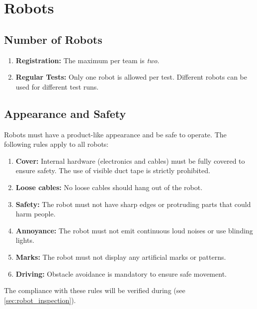 \section{Robots}\label{rule:robots}

\subsection{Number of Robots}\label{rule:robots_number}

\begin{enumerate}
	\item \textbf{Registration:} The maximum  per team is \emph{two}.
	\item \textbf{Regular Tests:} Only one robot is allowed per test. Different robots can be used for different test runs.
\end{enumerate}

\subsection{Appearance and Safety}\label{rule:robot_appearance}

Robots must have a product-like appearance and be safe to operate.
The following rules apply to all robots:
\begin{enumerate}
	\item \textbf{Cover:} Internal hardware (electronics and cables) must be fully covered to ensure safety. The use of visible duct tape is strictly prohibited.
	\item \textbf{Loose cables:} No loose cables should hang out of the robot.
	\item \textbf{Safety:} The robot must not have sharp edges or protruding parts that could harm people.
	\item \textbf{Annoyance:} The robot must not emit continuous loud noises or use blinding lights.
	\item \textbf{Marks:} The robot must not display any artificial marks or patterns.
	\item \textbf{Driving:} Obstacle avoidance is mandatory to ensure safe movement.
\end{enumerate}
The compliance with these rules will be verified during \RobotInspection{} (see \ref{sec:robot_inspection}).








